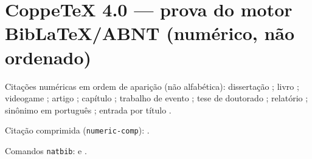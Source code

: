 \documentclass[12pt]{article}
\begin{document}
\section*{CoppeTeX 4.0 --- prova do motor BibLaTeX/ABNT (num\'erico, n\~ao ordenado)}

Cita\c{c}\~oes num\'ericas em ordem de apari\c{c}\~ao (n\~ao alfab\'etica):
disserta\c{c}\~ao \autocite{the1}; livro \autocite{book1}; videogame \autocite{civ6};
artigo \autocite{art1}; cap\'itulo \autocite{inc1}; trabalho de evento \autocite{inp1};
tese de doutorado \autocite{tesedsc}; relat\'orio \autocite{rep1};
sin\^onimo em portugu\^es \autocite{livpt}; entrada por t\'itulo \autocite{misc1}.

Cita\c{c}\~ao comprimida (\texttt{numeric-comp}): \autocite{the1,book1,civ6}.

Comandos \texttt{natbib}: \citet{art1} e \citep{book1}.

\printbibliography
\end{document}
